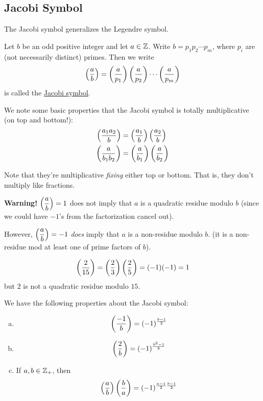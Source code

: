 \subsection{Jacobi Symbol}
The Jacobi symbol generalizes the Legendre symbol.
\begin{definition}
    Let $b$ be an odd positive integer and let $a\in\mathbb Z$. Write
    $b = p_1p_2\cdots p_m$, where $p_i$ are (not necessarily distinct) primes. Then we write
    \[\left(\dfrac{a}{b}\right) = \left(\dfrac{a}{p_1}\right)\left(\dfrac{a}{p_2}\right)\cdots \left(\dfrac{a}{p_m}\right)\]
    is called the \ul{Jacobi symbol}.
\end{definition}
We note some basic properties that the Jacobi symbol is totally multiplicative (on top and bottom!):
\begin{align*}
    \left(\dfrac{a_1a_2}{b}\right) & = \left(\dfrac{a_1}{b}\right)\left(\dfrac{a_2}{b}\right) \\
    \left(\dfrac{a}{b_1b_2}\right) & = \left(\dfrac{a}{b_1}\right)\left(\dfrac{a}{b_2}\right)
\end{align*}
\begin{remark*}
    Note that they're multiplicative \emph{fixing} either top or bottom. That is, they don't multiply like fractions.
\end{remark*}

\textbf{Warning!} $\left(\dfrac{a}{b}\right) = 1$ does not imply that $a$ is a quadratic residue modulo $b$ (since we could have $-1$'s from the factorization cancel out).

However, $\left(\dfrac{a}{b}\right) = -1$ \emph{does} imply that $a$ is a non-residue modulo $b$. (it is a non-residue mod at least one of prime factors of $b$).

\begin{example}
    \[\left(\dfrac{2}{15}\right) = \left(\dfrac{2}{3}\right)\left(\dfrac{2}{5}\right) = (-1)(-1) = 1\]
    but $2$ is not a quadratic residue modulo $15$.
\end{example}
\begin{proposition}[5.2.2 of Text]\label{prop:5.2.2}
    We have the following properties about the Jacobi symbol:
    \begin{enumerate}[(a)]
        \item \[\left(\dfrac{-1}{b}\right) = (-1)^{\frac{b-1}{2}}\]
        \item \[\left(\dfrac{2}{b}\right) = (-1)^{\frac{b^2 - 1}{8}}\]
        \item If $a, b\in\mathbb Z_+$, then
              \[\left(\dfrac{a}{b}\right)\left(\dfrac{b}{a}\right) = (-1)^{\frac{a-1}{2}\frac{b-1}{2}}\]
    \end{enumerate}
\end{proposition}